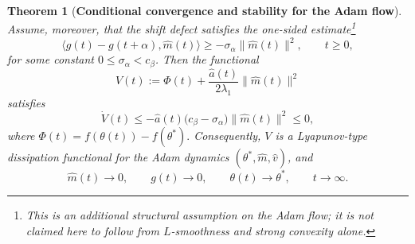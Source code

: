 \documentclass{article} %
\newtheorem{theorem}{Theorem}
\begin{document}
\begin{theorem}[\textbf{Conditional convergence and stability for the Adam flow}]
Assume, moreover, that the shift defect satisfies the one-sided estimate\footnote{This is an additional structural assumption on the Adam flow; it is not claimed here to follow from \(L\)-smoothness and strong convexity
alone.}
\begin{equation}\label{eq:shift_defect_onesided}
    \bigl\langle g(t)-g(t+\alpha),\widehat m(t)\bigr\rangle
    \geq
    -\sigma_\alpha\|\widehat m(t)\|^2,
    \qquad t\geq0,
\end{equation}
for some constant \(0\leq\sigma_\alpha<c_\beta\). Then the functional
\begin{equation}\label{eq:adam_shifted_lyapunov}
    V(t)
    :=
    \Phi(t)
    +
    \frac{\widehat a(t)}{2\lambda_1}
    \|\widehat m(t)\|^2
\end{equation}
satisfies
\begin{equation}\label{eq:adam_shifted_dissipation}
    \dot V(t)
    \leq
    -
    \widehat a(t)
    \bigl(c_\beta-\sigma_\alpha\bigr)
    \|\widehat m(t)\|^2
    \leq0,
\end{equation}
where $\Phi(t) = f(\theta(t))-f(\theta^*).$ Consequently, \(V\) is a Lyapunov-type dissipation functional for the Adam dynamics \((\theta^*, \widehat{m}, \widehat{v})\), and
\[
    \widehat m(t)\to0,
    \qquad
    g(t)\to0,
    \qquad
    \theta(t)\to\theta^*,
    \qquad
    t\to\infty.
\]
\end{theorem}
\end{document}
